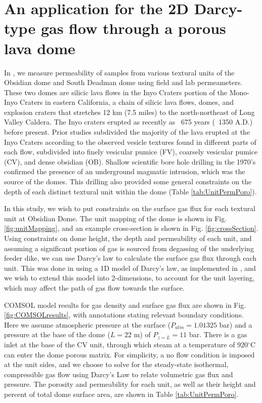 \documentclass[11pt]{article}
\begin{document}
\section{An application for the 2D Darcy-type gas flow through a porous lava dome}

In \cite{Graham2023}, we measure permeability of samples from various textural units of the Obsidian dome and South Deadman dome using field and lab permeameters. These two domes are silicic lava flows in the Inyo Craters portion of the Mono-Inyo Craters in eastern California, a chain of silicic lava flows, domes, and explosion craters that stretches 12 km (7.5 miles) to the north-northeast of Long Valley Caldera. The Inyo craters erupted as recently as ~675 years (~1350 A.D.) before present. Prior studies subdivided the majority of the lava erupted at the Inyo Craters according to the observed vesicle textures found in different parts of each flow, subdivided into finely vesicular pumice (FV), coarsely vesicular pumice (CV), and dense obsidian (OB). Shallow scientific bore hole drilling in the 1970's confirmed the presence of an underground magmatic intrusion, which was the source of the domes. This drilling also provided some general constraints on the depth of each distinct textural unit within the dome (Table \ref{tab:UnitPermPoro}).

In this study, we wish to put constraints on the surface gas flux for each textural unit at Obsidian Dome. The unit mapping of the dome is shown in Fig. \ref{fig:unitMapping}, and an example cross-section is shown in Fig. \ref{fig:crossSection}. Using constraints on dome height, the depth and permeability of each unit, and assuming a significant portion of gas is sourced from degassing of the underlying feeder dike, we can use Darcy's law to calculate the surface gas flux through each unit. This was done in \cite{Graham2023} using a 1D model of Darcy's law, as implemented in \cite{Edmonds2003}, and we wish to extend this model into 2-dimensions, to account for the unit layering, which may affect the path of gas flow towards the surface.

COMSOL model results for gas density and surface gas flux are shown in Fig. \ref{fig:COMSOLresults}, with annotations stating relevant boundary conditions. Here we assume atmospheric pressure at the surface ($P_{atm} = 1.01325$ bar) and a pressure at the base of the dome ($L=22$ m) of $P_{z=L} = 11$ bar. There is a gas inlet at the base of the CV unit, through which steam at a temperature of 920$^{\circ}$C can enter the dome porous matrix. For simplicity, a no flow condition is imposed at the unit sides, and we choose to solve for the steady-state isothermal, compressible gas flow using Darcy's Law to relate volumetric gas flux and pressure. The porosity and permeability for each unit, as well as their height and percent of total dome surface area, are shown in Table \ref{tab:UnitPermPoro}.
\end{document}

